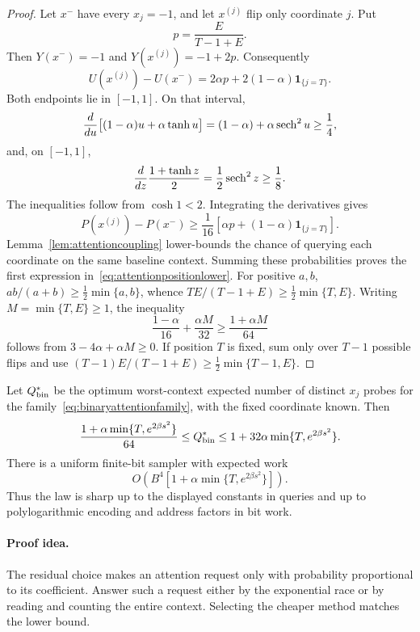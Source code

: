 \begin{proof}
Let $x^-$ have every $x_j=-1$, and let $x^{(j)}$ flip only coordinate $j$.
Put
\[
 p=\frac{E}{T-1+E}.
\]
Then $Y(x^-)=-1$ and $Y(x^{(j)})=-1+2p$.  Consequently
\[
 U(x^{(j)})-U(x^-)
 =2\alpha p+2(1-\alpha)\mathbf1_{\{j=T\}}.
\]
Both endpoints lie in $[-1,1]$.  On that interval,
\[
 \frac{d}{du}\bigl[(1-\alpha)u+\alpha\tanh u\bigr]
 =(1-\alpha)+\alpha\operatorname{sech}^2u\ge\frac14,
\]
and, on $[-1,1]$,
\[
 \frac{d}{dz}\frac{1+\tanh z}{2}=\frac12\operatorname{sech}^2z\ge\frac18.
\]
The inequalities follow from $\cosh1<2$.  Integrating the derivatives gives
\[
 P(x^{(j)})-P(x^-)
 \ge\frac1{16}\left[
 \alpha p+(1-\alpha)\mathbf1_{\{j=T\}}\right].
\]
Lemma~\ref{lem:attentioncoupling} lower-bounds the chance of querying each
coordinate on the same baseline context.  Summing these probabilities
proves the first expression in~\eqref{eq:attentionpositionlower}.
For positive $a,b$, $ab/(a+b)\ge\frac12\min\{a,b\}$, whence
$TE/(T-1+E)\ge\frac12\min\{T,E\}$.
Writing $M=\min\{T,E\}\ge1$, the inequality
\[
 \frac{1-\alpha}{16}+\frac{\alpha M}{32}
 \ge\frac{1+\alpha M}{64}
\]
follows from $3-4\alpha+\alpha M\ge0$.
If position $T$ is fixed, sum only over $T-1$ possible flips and use
$(T-1)E/(T-1+E)\ge\frac12\min\{T-1,E\}$.
\end{proof}

\begin{theorem}
\label{thm:binaryattentionlaw}
Let $Q^*_{\rm bin}$ be the optimum worst-context expected number of distinct
$x_j$ probes for the family~\eqref{eq:binaryattentionfamily}, with the fixed
coordinate known.  Then
\begin{equation}\label{eq:binaryattentionlaw}
 \frac{1+\alpha\min\{T,e^{2\beta s^2}\}}{64}
 \le Q^*_{\rm bin}
 \le 1+32\alpha\min\{T,e^{2\beta s^2}\}.
\end{equation}
There is a uniform finite-bit sampler with expected work
\[
 O\!\left(B^4[1+\alpha\min\{T,e^{2\beta s^2}\}]\right).
\]
Thus the law is sharp up to the displayed constants in queries and up to
polylogarithmic encoding and address factors in bit work.
\end{theorem}
\paragraph{Proof idea.}
The residual choice makes an attention request only with probability proportional to its coefficient.  Answer such a request either by the exponential race or by reading and counting the entire context.  Selecting the cheaper method matches the lower bound.

